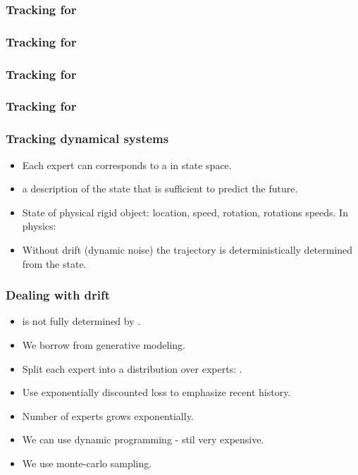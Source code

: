 \documentclass{beamer}
\begin{document}
\begin{frame}
\frametitle{Tracking for }
\end{frame}

\begin{frame}
\frametitle{Tracking for }
\end{frame}

\begin{frame}
\frametitle{Tracking for }
\end{frame}

\begin{frame}
\frametitle{Tracking for }
\end{frame}

\begin{frame}
\frametitle{Tracking dynamical systems}
\begin{itemize}
\item Each expert can corresponds to a  in state space.
\item {} a description of the state that is sufficient
  to predict the future.
\item State of physical rigid object: location, speed, rotation,
  rotations speeds. In physics: 
\item Without drift (dynamic noise) the trajectory is deterministically
  determined from the state.
\end{itemize}
\end{frame}

\begin{frame}
\frametitle{Dealing with drift}
\begin{itemize}
\item {} is not fully determined by .
\item We borrow from generative modeling.
\item Split each expert  into a distribution over experts:
.
\item Use exponentially discounted loss to emphasize recent history.
\item Number of experts grows exponentially.
\item We can use dynamic programming - stil very expensive.
\item We use monte-carlo sampling.
\end{itemize}
\end{frame}
\end{document}
